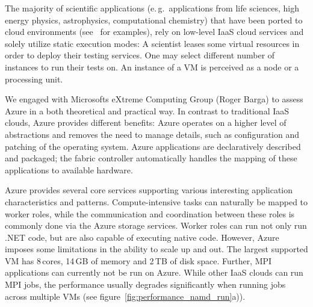 \documentclass[3p,twocolumn]{elsarticle}
\begin{document}

The majority of scientific applications (e.\,g.\ applications from life
sciences, high energy physics, astrophysics, computational chemistry)
that have been ported to cloud environments
(see~\cite{Hill,Begin:2008rq,saga_grid_cloud_interop} for examples),
rely on low-level IaaS cloud services and solely utilize static
execution modes: A scientist leases some virtual resources in order to
deploy their testing services. One may select different number of
instances to run their tests on. An instance of a VM is perceived as a
node or a processing unit. 


We engaged with Microsofts eXtreme Computing Group (Roger Barga) to assess
Azure in a both theoretical and practical way. In contrast to traditional 
IaaS clouds, Azure provides different benefits: Azure operates on a higher level of
abstractions and removes the need to manage details, such as
configuration and patching of the operating system. Azure applications
are declaratively described and packaged; the fabric controller
automatically handles the mapping of these applications to available
hardware.

Azure provides several core services supporting various interesting
application characteristics and patterns. Com\-pute-intensive tasks can
naturally be mapped to worker roles, while the communication and
coordination between these roles is commonly done via the Azure
storage services. Worker roles can run not only run .NET code, but are
also capable of executing native code. However, Azure imposes some
limitations in the ability to scale up and out. The largest supported
VM has 8\,cores, 14\,GB of memory and 2\,TB of disk space.  Further,
MPI applications can currently not be run on Azure. While other IaaS
clouds can run MPI jobs, the performance usually degrades
significantly when running jobs across multiple VMs (see
figure~\ref{fig:performance_namd_run}a)). %
\end{document}
